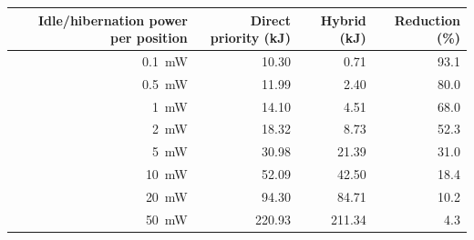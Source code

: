 \renewcommand{\arraystretch}{1.05}
\begin{tabular}{@{}rrrr@{}}
\toprule
Idle/hibernation power per position & Direct priority (kJ) & Hybrid (kJ) & Reduction (\%) \\
\midrule
0.1~mW  & 10.30 & 0.71   & 93.1 \\
0.5~mW  & 11.99 & 2.40   & 80.0 \\
1~mW    & 14.10 & 4.51   & 68.0 \\
2~mW    & 18.32 & 8.73   & 52.3 \\
5~mW    & 30.98 & 21.39  & 31.0 \\
10~mW   & 52.09 & 42.50  & 18.4 \\
20~mW   & 94.30 & 84.71  & 10.2 \\
50~mW   & 220.93 & 211.34 & 4.3 \\
\bottomrule
\end{tabular}
\renewcommand{\arraystretch}{1.10}
